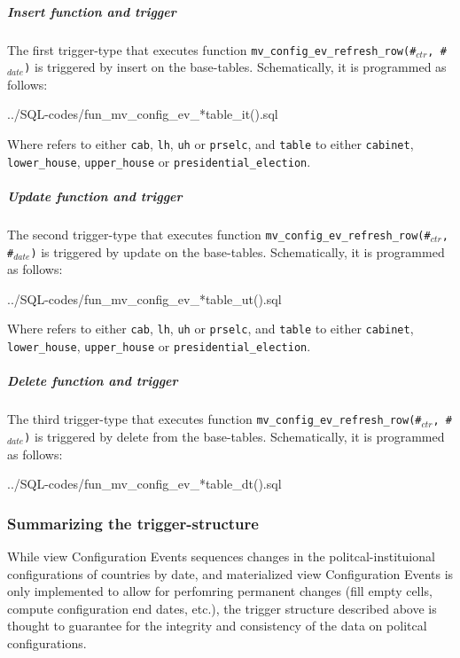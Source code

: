 \subparagraph{Insert function and trigger}
The first trigger-type that executes function \texttt{\footnotesize mv\_config\_ev\_refresh\_row(\#$_{ctr}$, \#$_{date}$)}  is triggered by insert on the base-tables.
Schematically, it is programmed as follows: 

%
{../SQL-codes/fun_mv_config_ev_*table_it().sql}

Where \texttt{\footnotesize *} refers to either \texttt{\footnotesize cab}, \texttt{\footnotesize lh}, \texttt{\footnotesize uh} or \texttt{\footnotesize prselc}, and \texttt{\footnotesize *table} to either \texttt{\footnotesize cabinet}, \texttt{\footnotesize lower\_house}, \texttt{\footnotesize upper\_house} or \texttt{\footnotesize presidential\_election}.

\subparagraph{Update function and trigger}
The second trigger-type that executes function \texttt{\footnotesize mv\_config\_ev\_refresh\_row(\#$_{ctr}$, \#$_{date}$)} is triggered by update on the base-tables.
Schematically, it is programmed as follows: 

%
{../SQL-codes/fun_mv_config_ev_*table_ut().sql}

Where \texttt{\footnotesize *} refers to either \texttt{\footnotesize cab}, \texttt{\footnotesize lh}, \texttt{\footnotesize uh} or \texttt{\footnotesize prselc}, and \texttt{\footnotesize *table} to either \texttt{\footnotesize cabinet}, \texttt{\footnotesize lower\_house}, \texttt{\footnotesize upper\_house} or \texttt{\footnotesize presidential\_election}.

 
\subparagraph{Delete function and trigger}
The third trigger-type that executes function \texttt{\footnotesize mv\_config\_ev\_refresh\_row(\#$_{ctr}$, \#$_{date}$)} is triggered by delete from the base-tables.
Schematically, it is programmed as follows: 

%
{../SQL-codes/fun_mv_config_ev_*table_dt().sql}

\subsubsection{Summarizing the trigger-structure}
While view Configuration Events sequences changes in the politcal-instituional configurations of countries by date, and materialized view Configuration Events is only implemented to allow for perfomring permanent changes (fill empty cells, compute configuration end dates, etc.), the trigger structure described above is thought to guarantee for the integrity and consistency of the data on politcal configurations.

